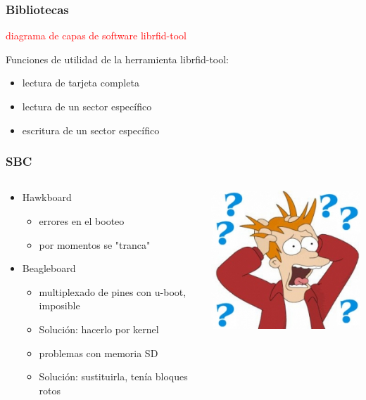 \documentclass{beamer}
\begin{document}
\begin{frame}
	\frametitle{Bibliotecas}
	\textcolor{red}{diagrama de capas de software librfid-tool}

	Funciones de utilidad de la herramienta librfid-tool:
	\begin{itemize}
		\item lectura de tarjeta completa

		\bigskip
		\item lectura de un sector específico

		\bigskip
		\item escritura de un sector específico
	\end{itemize}
\end{frame}

\begin{frame}
	\frametitle{SBC}
	\begin{columns}
		\begin{column}{8cm}	
			\begin{itemize}
				\item Hawkboard	
				\begin{itemize}
					\item errores en el booteo
					\item por momentos se "tranca"
				\end{itemize}

				\bigskip			
				\item Beagleboard
				\begin{itemize}
					\item multiplexado de pines con u-boot, imposible
					\item[ ] Solución: hacerlo por kernel
					\item problemas con memoria SD
					\item[ ] Solución: sustituirla, tenía bloques rotos
				\end{itemize}
			\end{itemize}
		\end{column}	
		\begin{column}{3cm}		
			\begin{center}
				\includegraphics[scale=.3]{Imagenes/preg.jpg}
			\end{center}
		\end{column}
	\end{columns}
\end{frame}
\end{document}
